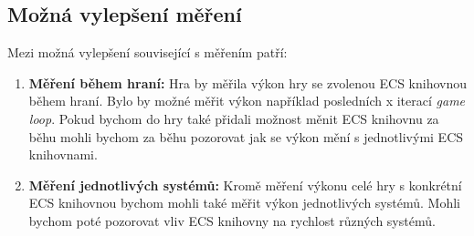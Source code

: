 \subsection{Možná vylepšení měření}
Mezi možná vylepšení související s měřením patří:

\begin{enumerate}
    \item \textbf{Měření během hraní:} Hra by měřila výkon hry se zvolenou ECS knihovnou během hraní. Bylo by možné měřit výkon například posledních x iterací \textit{game loop}. Pokud bychom do hry také přidali možnost měnit ECS knihovnu za běhu mohli bychom za běhu pozorovat jak se výkon mění s jednotlivými ECS knihovnami.
    
    \item \textbf{Měření jednotlivých systémů:} Kromě měření výkonu celé hry s konkrétní ECS knihovnou bychom mohli také měřit výkon jednotlivých systémů. Mohli bychom poté pozorovat vliv ECS knihovny na rychlost různých systémů. 
\end{enumerate}










